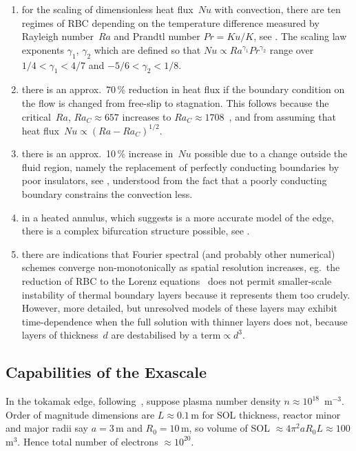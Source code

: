 \begin{enumerate}
\item for the scaling of dimensionless heat flux~$Nu$ with convection, there are ten regimes of RBC depending on the temperature difference measured by Rayleigh number~$Ra$
and Prandtl number $Pr=Ku/K$, see . The scaling law exponents $\gamma_1$, $\gamma_2$ which are
defined so that $Nu \propto Ra^{\gamma_1} Pr^{\gamma_2}$ range over $1/4 < \gamma_1 < 4/7$ and
$-5/6 < \gamma_2 < 1/8$.
\item  there is an approx.\ 70\,\% reduction in heat flux if the boundary condition on the
flow is changed from free-slip to stagnation. This follows because the critical~$Ra$,
 $Ra_C\approx657$ increases to $Ra_C\approx1708$~\cite{chandrasekhar},
and from assuming that heat flux~$Nu\propto (Ra-Ra_C)^{1/2}$.
\item there is an approx.\ 10\,\% increase in~$Nu$ possible due to a change outside the fluid region, 
namely the replacement of perfectly conducting boundaries by poor insulators, see ,
understood from the fact that a poorly conducting boundary constrains the convection less.
\item  in a heated annulus, which  suggests is a more accurate model of the edge,
there is a complex bifurcation structure possible, see .
\item  there are indications that Fourier spectral (and probably other numerical) schemes converge
non-monotonically as spatial resolution increases, eg.\ the reduction of RBC to the Lorenz equations~\cite{Lo63Dete}
does not permit smaller-scale instability of thermal boundary layers because it represents them too crudely.
However, more detailed, but unresolved models of these layers may exhibit time-dependence 
when the full solution with thinner layers does not, because layers of thickness~$d$ are destabilised
by a term$\propto d^3$.
\end{enumerate}



\subsection{Capabilities of the Exascale}\label{sec:cap}
In the tokamak edge, following~\cite{Wi19Stab}, 
suppose plasma number density $n \approx 10^{18}$\, m$^{-3}$. Order of magnitude
dimensions are $L\approx0.1$\,m for SOL thickness, reactor minor and major radii
say $a=3$\,m and $R_0=10$\,m, so volume of SOL $\approx 4 \pi^2 a R_0 L \approx 100$\,m$^3$.
Hence total number of electrons $\approx 10^{20}$.

